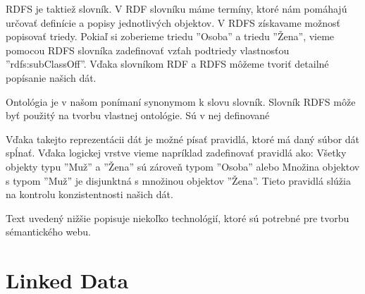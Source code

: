 \documentclass[12pt, a4paper, oneside]{book}
\begin{document}
RDFS je taktiež slovník. V RDF slovníku máme termíny, ktoré nám pomáhajú určovať definície a popisy jednotlivých objektov. V RDFS získavame možnosť popisovať triedy. Pokiaľ si zoberieme triedu ''Osoba'' a triedu ''Žena'', vieme pomocou RDFS slovníka zadefinovať vzťah podtriedy vlastnosťou ''rdfs:subClassOff''. Vďaka slovníkom RDF a RDFS môžeme tvoriť detailné popísanie našich dát.


Ontológia je v našom ponímaní synonymom k slovu slovník. Slovník RDFS môže byť použitý na tvorbu vlastnej ontológie. Sú v nej definované 


Vďaka takejto reprezentácii dát je možné písať pravidlá, ktoré má daný súbor dát spĺnať. Vďaka logickej vrstve vieme napríklad zadefinovať pravidlá ako: Všetky objekty typu ''Muž'' a ''Žena'' sú zároveň typom ''Osoba'' alebo Množina objektov s typom ''Muž'' je disjunktná s množinou objektov ''Žena''. Tieto pravidlá slúžia na kontrolu konzistentnosti našich dát.





Text uvedený nižšie popisuje niekoľko technológií, ktoré sú potrebné pre tvorbu sémantického webu.

\section{Linked Data}

\end{document}
